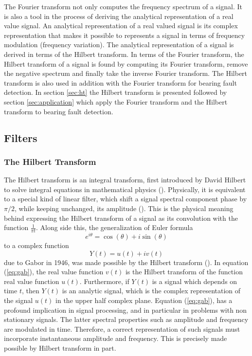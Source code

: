 \documentclass[../Main/thesis.tex]{subfiles}
\begin{document}
\justify
The Fourier transform not only computes the frequency spectrum of a signal. It is also a tool in the process of deriving the analytical representation of a real value signal. An analytical representation of a real valued signal is its complex representation that makes it possible to represents a signal in terms of frequency modulation (frequency variation). The analytical representation of a signal is derived in terms of the Hilbert transform. In terms of the Fourier transform, the Hilbert transform of a signal is found by computing its Fourier transform, remove the negative spectrum and finally take the inverse Fourier transform. The Hilbert transform is also used in addition with the Fourier transform for bearing fault detection. In section \ref{sec:ht} the Hilbert transform is presented followed by section \ref{sec:application} which apply the Fourier transform and the Hilbert transform to bearing fault detection.
\subsection{Filters}
\label{sec:filters}
\subsubsection{The Hilbert Transform}
\label{sec:hilbert-transform}
The Hilbert transform is an integral transform, first introduced by David Hilbert to solve integral equations in mathematical physics (\cite{gabor1982}). Physically, it is equivalent to a special kind of linear filter, which shift a signal spectral component phase by $\pi/2$, while keeping unchanged, its amplitude (\cite{feldman2010}). This is the physical meaning behind expressing the Hilbert transform of a signal as its convolution with the function $\frac{1}{\pi t}$. Along side this, the generalization of Euler formula
\begin{equation}
	e^{i\theta} = \cos(\theta) + i\sin(\theta)
\end{equation}
 to a complex function
 \begin{equation}\label{eq:gab}
 	  Y(t) = u(t) +iv(t)
 \end{equation}
due to Gabor in 1946, was made possible by the Hilbert transform (\cite{feldman2010}). In equation (\ref{eq:gab}), the real value function $v(t)$ is the Hilbert transform of the function real value function $u(t)$. Furthermore, if $Y(t)$ is a signal which depends on time $t$, then $Y(t)$ is an analytic signal, which is the complex representation of the signal $u(t)$ in the upper half complex plane.
\justify
Equation (\ref{eq:gab}), has a profound implication in signal processing, and in particular in problems with non stationary signals. The latter spectral properties such as amplitude and frequency are modulated in time. Therefore, a correct representation of such signals must incorporate instantaneous amplitude and frequency. This is precisely made possible by Hilbert transform in part.
\end{document}
